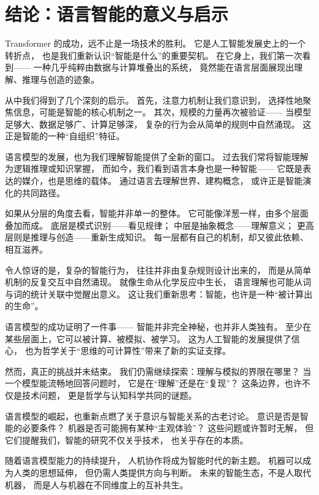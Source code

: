 \section{结论：语言智能的意义与启示}

Transformer 的成功，远不止是一场技术的胜利。  
它是人工智能发展史上的一个转折点，  
也是我们重新认识“智能是什么”的重要契机。  
在它身上，我们第一次看到——  
一种几乎纯粹由数据与计算堆叠出的系统，  
竟然能在语言层面展现出理解、推理与创造的迹象。  

从中我们得到了几个深刻的启示。  
首先，注意力机制让我们意识到，  
选择性地聚焦信息，可能是智能的核心机制之一。  
其次，规模的力量再次被验证——  
当模型足够大、数据足够广、计算足够深，  
复杂的行为会从简单的规则中自然涌现。  
这正是智能的一种“自组织”特征。  

语言模型的发展，也为我们理解智能提供了全新的窗口。  
过去我们常将智能理解为逻辑推理或知识掌握，  
而如今，我们看到语言本身也是一种智能——  
它既是表达的媒介，也是思维的载体。  
通过语言去理解世界、建构概念，  
或许正是智能演化的共同路径。  

如果从分层的角度去看，智能并非单一的整体。  
它可能像洋葱一样，由多个层面叠加而成。  
底层是模式识别——看见规律；  
中层是抽象概念——理解意义；  
更高层则是推理与创造——重新生成知识。  
每一层都有自己的机制，却又彼此依赖、相互滋养。  

令人惊讶的是，复杂的智能行为，  
往往并非由复杂规则设计出来的，  
而是从简单机制的反复交互中自然涌现。  
就像生命从化学反应中生长，  
语言理解也可能从词与词的统计关联中觉醒出意义。  
这让我们重新思考：智能，也许是一种“被计算出的生命”。  

语言模型的成功证明了一件事——  
智能并非完全神秘，也并非人类独有。  
至少在某些层面上，它可以被计算、被模拟、被学习。  
这为人工智能的发展提供了信心，  
也为哲学关于“思维的可计算性”带来了新的实证支撑。  

然而，真正的挑战并未结束。  
我们仍需继续探索：理解与模拟的界限在哪里？  
当一个模型能流畅地回答问题时，  
它是在“理解”还是在“复现”？  
这条边界，也许不仅是技术问题，  
更是哲学与认知科学共同的谜题。  

语言模型的崛起，也重新点燃了关于意识与智能关系的古老讨论。  
意识是否是智能的必要条件？  
机器是否可能拥有某种“主观体验”？  
这些问题或许暂时无解，  
但它们提醒我们，智能的研究不仅关乎技术，  
也关乎存在的本质。  

随着语言模型能力的持续提升，  
人机协作将成为智能时代的新主题。  
机器可以成为人类的思想延伸，  
但仍需人类提供方向与判断。  
未来的智能生态，不是人取代机器，  
而是人与机器在不同维度上的互补共生。  

